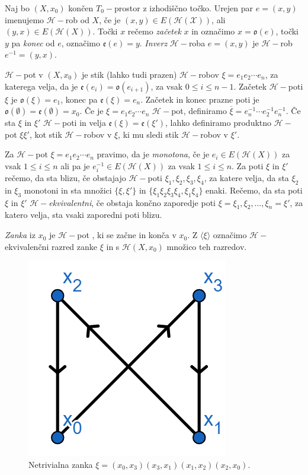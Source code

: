 \documentclass[mat1]{fmfdelo}
\DeclareRobustCommand{\h}{
    \mathcal{H}}
\DeclareRobustCommand{\pot}{
    $\h-$pot
}
\begin{document}
\begin{definicija}
    Naj bo $(X,x_0)$ končen $T_0-$prostor z izhodiščno točko. Urejen par 
$e=(x,y)$ imenujemo $\mathcal{H}-$rob od $X$, če je $(x,y)\in 
E(\mathcal{H}(\mathcal{X}))$, ali $(y,x)\in 
E(\h(X))$. Točki $x$ rečemo \emph{začetek} $x$ in označimo 
$x=\mathfrak{o}(e)$, točki $y$ pa \emph{konec} od $e$, 
označimo $\mathfrak{e}(e)=y$. \emph{Inverz} $\h-$roba $e=(x,y)$ je $\h-$rob $e^{-1}=(y,x)$.

$\h-$pot v $(X,x_0)$ je stik (lahko tudi prazen) $\h-$robov $\xi=e_1e_2\cdots e_n$, 
za katerega velja, da je $\mathfrak{e}(e_i)=\mathfrak{o}(e_{i+1})$, za vsak $0\leq i \leq n-1$.
 Začetek $\h-$poti $\xi$ je  $\mathfrak{o}(\xi)=e_1$, konec pa $\mathfrak{e}(\xi)=e_n$.
 Začetek in konec prazne poti je $\mathfrak{o}(\emptyset)=\mathfrak{e}(\emptyset)=x_0$.
 Če je $\xi=e_1e_2\cdots e_n$ $\h-$pot, definiramo $\overline{\xi}=e_n^{-1}\cdots 
 e_2^{-1}e_n^{-1}$. Če sta $\xi$ in $\xi'$ $\h-$poti in velja $\mathfrak{e}(\xi)=
 \mathfrak{e}(\xi')$, lahko definiramo produktno \pot $\xi\xi'$, kot stik
 $\h-$robov v $\xi$, ki mu sledi stik $\h-$robov v $\xi'$.

 Za \pot $\xi=e_1e_2\cdots e_n$ pravimo, da je \emph{monotona}, če je $e_i\in 
 E(\h(X))$ za vsak $1\leq i \leq n$ ali pa je $e_i^{-1}\in E(\h(X))$ za vsak $1\leq i \leq n$.
  Za poti $\xi$ in
  $\xi'$ rečemo, da sta blizu, če obstajajo $\h-$poti $\xi_1,\xi_2,\xi_3,\xi_4$, za katere velja, da sta $\xi_2$ in $\xi_3$ monotoni in sta množici $\{\xi,\xi'\}$ in $\{\xi_1\xi_2\xi_3\xi_4,\xi_1\xi_4\}$ enaki. Rečemo, da sta poti $\xi$ in $\xi'$ \emph{$\h-$ekvivalentni}, če obstaja končno zaporedje poti $\xi=\xi_1,\xi_2, \ldots ,\xi_n=\xi'$, za katero velja, sta vsaki zaporedni poti blizu.

   \emph{Zanka} iz $x_0$ je \pot, ki se začne in konča v $x_0$.
   Z $\langle\xi\rangle$ označimo $\h-$ ekvivalenčni razred zanke $\xi$ in s $\mathscr{H}(X,x_0)$ množico teh razredov.
\end{definicija}


  \begin{figure}[h!]
    \centering
    \includegraphics[width=0.2\linewidth]{primer-hasse-zanka.png}
  \caption{Netrivialna zanka $\xi=(x_0,x_3)(x_3,x_1)(x_1,x_2)(x_2,x_0)$.}
  \end{figure}
\end{document}
